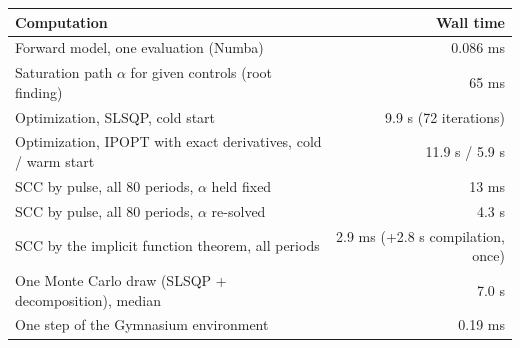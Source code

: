 \begin{tabular}{lr}
\toprule
Computation & Wall time \\
\midrule
Forward model, one evaluation (Numba) & 0.086 ms \\
Saturation path $\alpha$ for given controls (root finding) & 65 ms \\
Optimization, SLSQP, cold start & 9.9 s (72 iterations) \\
Optimization, IPOPT with exact derivatives, cold / warm start & 11.9 s / 5.9 s \\
SCC by pulse, all 80 periods, $\alpha$ held fixed & 13 ms \\
SCC by pulse, all 80 periods, $\alpha$ re-solved & 4.3 s \\
SCC by the implicit function theorem, all periods & 2.9 ms (+2.8 s compilation, once) \\
One Monte Carlo draw (SLSQP + decomposition), median & 7.0 s \\
One step of the Gymnasium environment & 0.19 ms \\
\bottomrule
\end{tabular}
